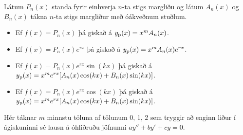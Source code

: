 Látum $P_n(x)$ standa fyrir einhverja $n$-ta stigs margliðu og látum
$A_n(x)$ og $B_n(x)$ tákna $n$-ta stigs margliður með óákveðnum stuðlum. 

\begin{itemize}
\item Ef $f(x)=P_n(x)$ þá giskað á $y_{\rm p}(x)=x^mA_n(x)$.
\item Ef $f(x)=P_n(x)e^{rx}$ þá giskað á $y_{\rm p}(x)=x^mA_n(x)e^{rx}$.
\item Ef $f(x)=P_n(x)e^{rx}\sin(kx)$ 
þá giskað á $y_{\rm p}(x)=x^me^{rx}[A_n(x)\cos(kx)+B_n(x)\sin(kx)]$.
\item Ef $f(x)=P_n(x)e^{rx}\cos(kx)$ 
þá giskað á $y_{\rm p}(x)=x^me^{rx}[A_n(x)\cos(kx)+B_n(x)\sin(kx)]$.
\end{itemize} \pause
Hér táknar $m$ minnstu töluna af tölunum 0, 1, 2 sem tryggir að enginn
liður í ágiskuninni sé lausn á óhliðruðu jöfnunni $ay''+by'+cy=0$.

 

% 
%  
%  
% 
% 
%  
%  
% 




